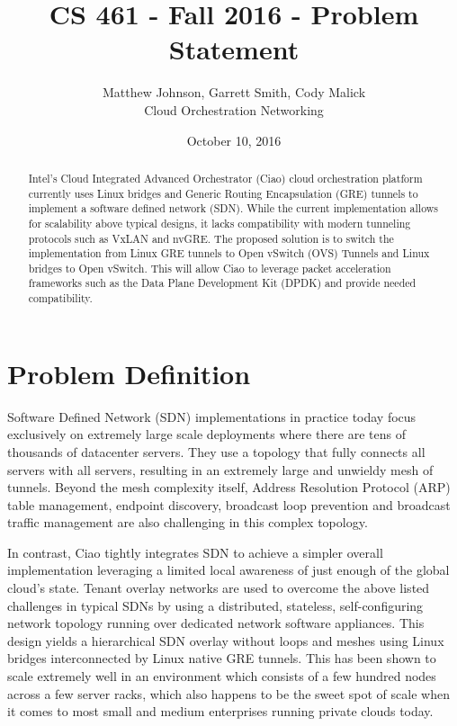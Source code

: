 \documentclass[10pt,letterpaper,onecolumn,draftclsnofoot]{IEEEtran}
\begin{document}
\begin{titlepage}
  \title{CS 461 - Fall 2016 - Problem Statement}
  \author{Matthew Johnson, Garrett Smith, Cody Malick\\Cloud Orchestration
  Networking}
  \date{October 10, 2016}
  \maketitle
  \vspace{4cm}
  \begin{abstract}
  	\noindent Intel's Cloud Integrated Advanced Orchestrator (Ciao) cloud
	orchestration platform currently uses Linux bridges and Generic Routing
	Encapsulation (GRE) tunnels to implement a software defined network
	(SDN). While the current implementation allows for scalability above
	typical designs, it lacks compatibility with modern tunneling protocols
	such as VxLAN and nvGRE. The proposed solution is to switch the
	implementation from Linux GRE tunnels to Open vSwitch (OVS) Tunnels and
	Linux bridges to Open vSwitch. This will allow Ciao to leverage packet
	acceleration frameworks such as the Data Plane Development Kit (DPDK)
	and provide needed compatibility.
  \end{abstract}
\end{titlepage}

\section*{Problem Definition}
Software Defined Network (SDN) implementations in practice today focus
exclusively on extremely large scale deployments where there are tens of
thousands of datacenter servers. They use a topology that fully connects all
servers with all servers, resulting in an extremely large and unwieldy mesh of
tunnels. Beyond the mesh complexity itself, Address Resolution Protocol (ARP)
table management, endpoint discovery, broadcast loop prevention and broadcast
traffic management are also challenging in this complex topology.

In contrast, Ciao tightly integrates SDN to achieve a simpler overall
implementation leveraging a limited local awareness of just enough of the global
cloud’s state. Tenant overlay networks are used to overcome the above listed
challenges in typical SDNs by using a distributed, stateless, self-configuring
network topology running over dedicated network software appliances. This design
yields a hierarchical SDN overlay without loops and meshes using Linux bridges
interconnected by Linux native GRE tunnels. This has been shown to scale
extremely well in an environment which consists of a few hundred nodes across a
few server racks, which also happens to be the sweet spot of scale when it comes
to most small and medium enterprises running private clouds today.
\end{document}
